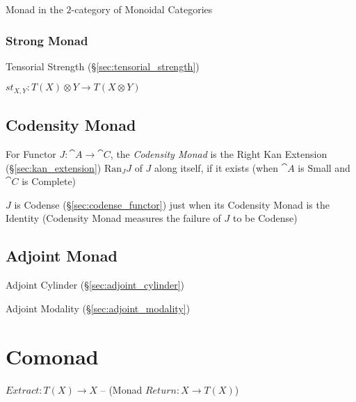 Monad in the $2$-category of Monoidal Categories




\subsubsection{Strong Monad}\label{sec:strong_monad}

Tensorial Strength (\S\ref{sec:tensorial_strength})

$st_{X,Y} : T(X) \otimes Y \rightarrow T(X \otimes Y)$



\subsection{Codensity Monad}\label{sec:codensity_monad}

For Functor $J : \cat{A} \rightarrow \cat{C}$, the \emph{Codensity
  Monad} is the Right Kan Extension (\S\ref{sec:kan_extension})
$\mathrm{Ran}_J J$ of $J$ along itself, if it exists (when $\cat{A}$
is Small and $\cat{C}$ is Complete)

$J$ is Codense (\S\ref{sec:codense_functor}) just when its Codensity
Monad is the Identity (Codensity Monad measures the failure of $J$ to
be Codense)



\subsection{Adjoint Monad}\label{sec:adjoint_monad}

Adjoint Cylinder (\S\ref{sec:adjoint_cylinder})

Adjoint Modality (\S\ref{sec:adjoint_modality})



\section{Comonad}\label{sec:comonad}

$Extract : T(X) \rightarrow X$ -- (Monad $Return : X \rightarrow
T(X)$)

